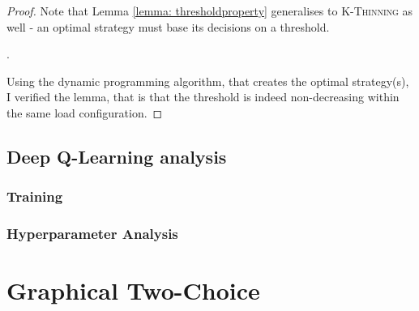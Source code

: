 \begin{proof}
Note that Lemma \ref{lemma: thresholdproperty} generalises to \textsc{K-Thinning} as well - an optimal strategy must base its decisions on a threshold.


.


Using the dynamic programming algorithm, that creates the optimal strategy(s), I verified the lemma, that is that the threshold is indeed non-decreasing within the same load configuration.
\end{proof}


\subsection{Deep Q-Learning analysis}


\subsubsection{Training}


\subsubsection{Hyperparameter Analysis}



\section{Graphical Two-Choice}


